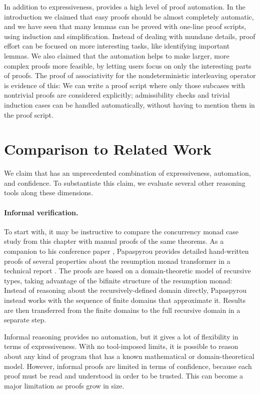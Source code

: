 In addition to expressiveness,  provides a high level of proof automation. In the introduction we claimed that easy proofs should be almost completely automatic, and we have seen that many lemmas can be proved with one-line proof scripts, using induction and simplification. Instead of dealing with mundane details, proof effort can be focused on more interesting tasks, like identifying important lemmas. We also claimed that the automation helps to make larger, more complex proofs more feasible, by letting users focus on only the interesting parts of proofs. The proof of associativity for the nondeterministic interleaving operator is evidence of this: We can write a proof script where only those subcases with nontrivial proofs are considered explicitly; admissibility checks and trivial induction cases can be handled automatically, without having to mention them in the proof script.

\section{Comparison to Related Work}
\label{sec:case-related}

We claim that  has an unprecedented combination of expressiveness, automation, and confidence. To substantiate this claim, we evaluate several other reasoning tools along these dimensions.

\paragraph{Informal verification.}

To start with, it may be instructive to compare the  concurrency monad case study from this chapter with manual proofs of the same theorems. As a companion to his conference paper \cite{Papaspyrou01}, Papaspyrou provides detailed hand-written proofs of several properties about the resumption monad transformer in a technical report \cite{Papaspyrou2001tech}. The proofs are based on a domain-theoretic model of recursive types, taking advantage of the bifinite structure of the resumption monad: Instead of reasoning about the recursively-defined domain directly, Papaspyrou instead works with the sequence of finite domains that approximate it. Results are then transferred from the finite domains to the full recursive domain in a separate step.

Informal reasoning provides no automation, but it gives a lot of flexibility in terms of expressiveness. With no tool-imposed limits, it is possible to reason about any kind of program that has a known mathematical or domain-theoretical model. However, informal proofs are limited in terms of confidence, because each proof must be read and understood in order to be trusted. This can become a major limitation as proofs grow in size.

